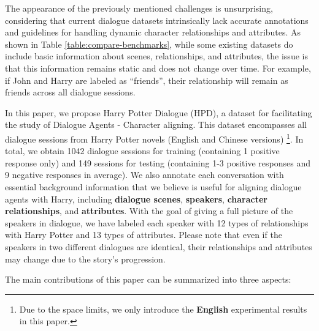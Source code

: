 \documentclass[11pt]{article}
\begin{document}
The appearance of the previously mentioned challenges is unsurprising, considering that current dialogue datasets intrinsically lack accurate annotations and guidelines for handling dynamic character relationships and attributes.
As shown in Table \ref{table:compare-benchmarks}, while some existing datasets \cite{DBLP:conf/acl/KielaWZDUS18,DBLP:journals/corr/abs-1901-09672,DBLP:journals/corr/abs-2112-08619,ding2023enhancing} do include basic information about scenes, relationships, and attributes, the issue is that this information remains static and does not change over time. For example, if John and Harry are labeled as ``friends'',  their relationship will remain as friends across all dialogue sessions.


In this paper, we propose Harry Potter Dialogue (HPD), a dataset for facilitating the study of 
Dialogue Agents - Character aligning. This dataset encompasses all dialogue sessions from Harry Potter novels (English and Chinese versions) \footnote{Due to the space limits, we only introduce the \textbf{English}  experimental results in this paper.}. In total, we obtain 1042 dialogue sessions for training (containing 1 positive response only) and 149 sessions for testing (containing 1-3 positive responses and 9 negative responses in average).
We also annotate each conversation with essential background information that we believe is useful for aligning dialogue agents with Harry, including \textbf{dialogue scenes}, \textbf{speakers}, \textbf{character relationships}, and \textbf{attributes}. With the goal of giving a full picture of the speakers in dialogue, we have labeled each speaker with  12 types of relationships with Harry Potter and 13 types of attributes.
Please note that even if the speakers in two different dialogues are identical, their relationships and attributes may change due to the story's progression.

The main contributions of this paper can be summarized into three aspects:
\end{document}
